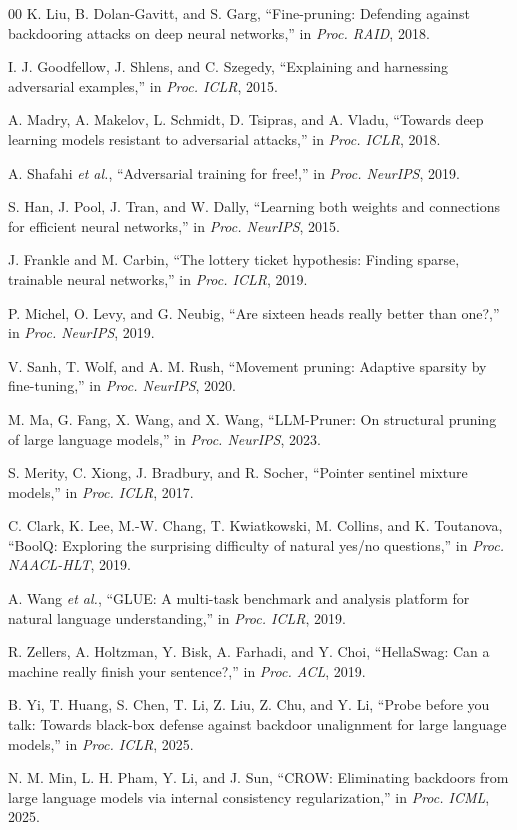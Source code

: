 \documentclass[lettersize,journal]{IEEEtran}
\begin{document}
\begin{thebibliography}{00}
K. Liu, B. Dolan-Gavitt, and S. Garg, ``Fine-pruning: Defending against backdooring attacks on deep neural networks,'' in \emph{Proc. RAID}, 2018.

I. J. Goodfellow, J. Shlens, and C. Szegedy, ``Explaining and harnessing adversarial examples,'' in \emph{Proc. ICLR}, 2015.

A. Madry, A. Makelov, L. Schmidt, D. Tsipras, and A. Vladu, ``Towards deep learning models resistant to adversarial attacks,'' in \emph{Proc. ICLR}, 2018.

A. Shafahi \emph{et al.}, ``Adversarial training for free!,'' in \emph{Proc. NeurIPS}, 2019.

S. Han, J. Pool, J. Tran, and W. Dally, ``Learning both weights and connections for efficient neural networks,'' in \emph{Proc. NeurIPS}, 2015.

J. Frankle and M. Carbin, ``The lottery ticket hypothesis: Finding sparse, trainable neural networks,'' in \emph{Proc. ICLR}, 2019.

P. Michel, O. Levy, and G. Neubig, ``Are sixteen heads really better than one?,'' in \emph{Proc. NeurIPS}, 2019.

V. Sanh, T. Wolf, and A. M. Rush, ``Movement pruning: Adaptive sparsity by fine-tuning,'' in \emph{Proc. NeurIPS}, 2020.

M. Ma, G. Fang, X. Wang, and X. Wang, ``LLM-Pruner: On structural pruning of large language models,'' in \emph{Proc. NeurIPS}, 2023.

S. Merity, C. Xiong, J. Bradbury, and R. Socher, ``Pointer sentinel mixture models,'' in \emph{Proc. ICLR}, 2017.

C. Clark, K. Lee, M.-W. Chang, T. Kwiatkowski, M. Collins, and K. Toutanova, ``BoolQ: Exploring the surprising difficulty of natural yes/no questions,'' in \emph{Proc. NAACL-HLT}, 2019.

A. Wang \emph{et al.}, ``GLUE: A multi-task benchmark and analysis platform for natural language understanding,'' in \emph{Proc. ICLR}, 2019.

R. Zellers, A. Holtzman, Y. Bisk, A. Farhadi, and Y. Choi, ``HellaSwag: Can a machine really finish your sentence?,'' in \emph{Proc. ACL}, 2019.

B. Yi, T. Huang, S. Chen, T. Li, Z. Liu, Z. Chu, and Y. Li, ``Probe before you talk: Towards black-box defense against backdoor unalignment for large language models,'' in \emph{Proc. ICLR}, 2025.

N. M. Min, L. H. Pham, Y. Li, and J. Sun, ``CROW: Eliminating backdoors from large language models via internal consistency regularization,'' in \emph{Proc. ICML}, 2025.

\end{thebibliography}
\end{document}
